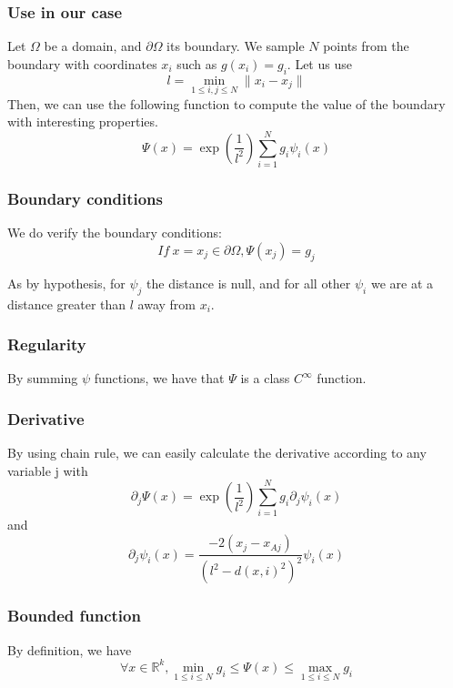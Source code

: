 \subsubsection{Use in our case}
Let $\Omega$ be a domain, and $\partial\Omega$ its boundary. We sample $N$ points from the boundary with coordinates $x_i$ such as $g(x_i)=g_i$. Let us use 
\[
l = \min_{1\leq i,j \leq N}\lVert x_i - x_j \rVert
\]
\newline
Then, we can use the following function to compute the value of the boundary with interesting properties.
\begin{equation*}
    \Psi(x) = \exp \left( \frac{1}{l^2} \right) \sum_{i=1}^{N}g_i\psi_i(x)
\end{equation*}

\subsubsection{Boundary conditions} 
We do verify the boundary conditions:
\begin{equation*}
    If \ x=x_j\in \partial \Omega, \Psi(x_j) = g_j
\end{equation*}

As by hypothesis, for $\psi_j$ the distance is null, and for all other $\psi_i$ we are at a distance greater than $l$ away from $x_i$.

\subsubsection{Regularity}
By summing $\psi$ functions, we have that $\Psi$ is a class $C^\infty$ function.

\subsubsection{Derivative}
By using chain rule, we can easily calculate the derivative according to any variable j with
\begin{equation*}
    \partial_j \Psi(x) = \exp\left(\frac{1}{l^2}\right)\sum_{i=1}^{N}g_i\partial_j\psi_i(x)
\end{equation*}
and
\begin{equation*}
    \partial_j\psi_i(x) = \frac{-2(x_j-x_{Aj})}{(l^2 - d(x,i)^2)^2}\psi_i(x)
\end{equation*}

\subsubsection{Bounded function}
By definition, we have
\begin{equation*}
    \forall x \in \mathbb{R}^k, \min_{1 \leq i \leq N}g_i \leq \Psi(x) \leq \max_{1 \leq i \leq N}g_i
\end{equation*}

